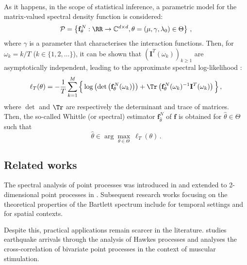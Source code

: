         As it happens, in the scope of statistical inference, a parametric model for the matrix-valued spectral density function is considered:
        \[
            \mathcal{P} = \left\{
              \mathbf{f}_\theta^N : \RR \to \mathbb C^{d \times d},
              \theta = (\mu, \gamma, \lambda_0)\in \Theta
            \right\} \,,
        \]
        where $\gamma$ is a parameter that characterises the interaction functions.
        Then, for $\omega_k = k/T$ ($k \in \{1, 2, \dots\}$), it can be shown that $(\mathbf I^T(\omega_k))_{k \geq 1}$ are asymptotically independent,
        leading to the approximate spectral log-likelihood \parencite{Brillinger2012, Duker2019, Villani2022}:
        \begin{equation}\label{eq:chap3_spectral_log_likelihood}
	        \ell_T(\theta) = -\frac{1}{T} \sum_{k=1}^{M}
	        \Big\{
	          \log\left(\det\left(\mathbf{f}_\theta^N(\omega_k)\right)\right) +
	          \Tr\left(\mathbf{f}_\theta^N(\omega_k)^{-1}\mathbf{I}^T(\omega_k)\right)
	        \Big\} \,,
        \end{equation}
        where $\det$ and $\Tr$ are respectively the determinant and trace of matrices.
        Then, the so-called Whittle (or spectral) estimator $\mathbf f_{\hat \theta}^N$ of $\mathbf f$ \parencite{Whittle1952} is obtained for \(\hat \theta \in \Theta\) such that
        \[
          \hat \theta \in \arg\max_{\theta \in \Theta}~ \ell_T (\theta) \,.
        \]
         
        
        

      \subsection{Related works}
      \label{sec:chap3_related_works}
        The spectral analysis of point processes was introduced in \textcite{Bartlett1963} and extended to 2-dimensional point processes in \textcite{Bartlett1964}.
        Subsequent research works focusing on the theoretical properties of the Bartlett spectrum include \textcite{Daley1971, DaleyV1, Tuan1981} for temporal settings and \textcite{Mugglestone1996, Mugglestone2001, Rajala2023} for spatial contexts.
        
        Despite this, practical applications remain scarcer in the literature.
        \textcite{Adamopoulos1976} studies earthquake arrivals through the analysis of Hawkes processes and \textcite{Karavasilis2007} analyses the cross-correlation of bivariate point processes in the context of muscular stimulation.
        
